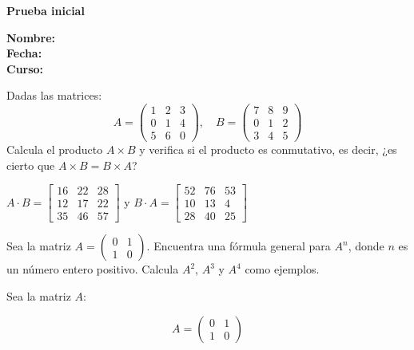 \documentclass{exam}
\begin{document}
\begin{center}
\bfseries Prueba inicial
\end{center}
\textbf{Nombre:} \\
\textbf{Fecha:} \\
\textbf{Curso:} \\
\hline

\begin{questions}

\question Dadas las matrices:
\[
A = \begin{pmatrix} 
1 & 2 & 3 \\ 
0 & 1 & 4 \\ 
5 & 6 & 0 
\end{pmatrix}, \quad
B = \begin{pmatrix} 
7 & 8 & 9 \\ 
0 & 1 & 2 \\ 
3 & 4 & 5 
\end{pmatrix}
\]
Calcula el producto \( A \times B \) y verifica si el producto es conmutativo, es decir, ¿es cierto que \( A \times B = B \times A \)?
\begin{solution}
    $A\cdot B = \left[\begin{matrix}16 & 22 & 28\\12 & 17 & 22\\35 & 46 & 57\end{matrix}\right]$ y $B \cdot A= \left[\begin{matrix}52 & 76 & 53\\10 & 13 & 4\\28 & 40 & 25\end{matrix}\right]$
\end{solution}

\vspace{250pt}

\question Sea la matriz
$
A = \begin{pmatrix} 0 & 1 \\ 1 & 0 \end{pmatrix}
$. Encuentra una fórmula general para \( A^n \), donde \( n \) es un número entero positivo. Calcula \( A^2 \), \( A^3 \) y \( A^4 \) como ejemplos.

\begin{solution}

Sea la matriz \( A \):

\[
A = \begin{pmatrix} 0 & 1 \\ 1 & 0 \end{pmatrix}
\]


\end{solution}
\end{questions}
\end{document}
